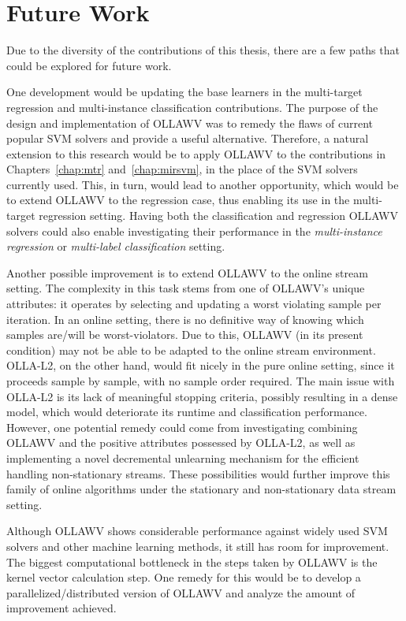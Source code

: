 \documentclass[reqno]{vcuthesis}
\numberwithin{equation}{chapter}
\begin{document}
\chapter{Future Work}
Due to the diversity of the contributions of this thesis, there are a few paths that could be explored for future work. 

One development would be updating the base learners in the multi-target regression and multi-instance classification contributions. The purpose of the design and implementation of OLLAWV was to remedy the flaws of current popular SVM solvers and provide a useful alternative. Therefore, a natural extension to this research would be to apply OLLAWV to the contributions in Chapters~\ref{chap:mtr} and~\ref{chap:mirsvm}, in the place of the SVM solvers currently used. This, in turn, would lead to another opportunity, which would be to extend OLLAWV to the regression case, thus enabling its use in the multi-target regression setting. Having both the classification and regression OLLAWV solvers could also enable investigating their performance in the \textit{multi-instance regression} or \textit{multi-label classification} setting.

Another possible improvement is to extend OLLAWV to the online stream setting. The complexity in this task stems from one of OLLAWV's unique attributes: it operates by selecting and updating a worst violating sample per iteration. In an online setting, there is no definitive way of knowing which samples are/will be worst-violators. Due to this, OLLAWV (in its present condition) may not be able to be adapted to the online stream environment. OLLA-L2, on the other hand, would fit nicely in the pure online setting, since it proceeds sample by sample, with no sample order required. The main issue with OLLA-L2 is its lack of meaningful stopping criteria, possibly resulting in a dense model, which would deteriorate its runtime and classification performance. However, one potential remedy could come from investigating combining OLLAWV and the positive attributes possessed by OLLA-L2, as well as implementing a novel decremental unlearning mechanism for the efficient handling non-stationary streams. These possibilities would further improve this family of online algorithms under the stationary and non-stationary data stream setting.

Although OLLAWV shows considerable performance against widely used SVM solvers and other machine learning methods, it still has room for improvement. The biggest computational bottleneck in the steps taken by OLLAWV is the kernel vector calculation step. One remedy for this would be to develop a parallelized/distributed version of OLLAWV and analyze the amount of improvement achieved. 
\end{document}
